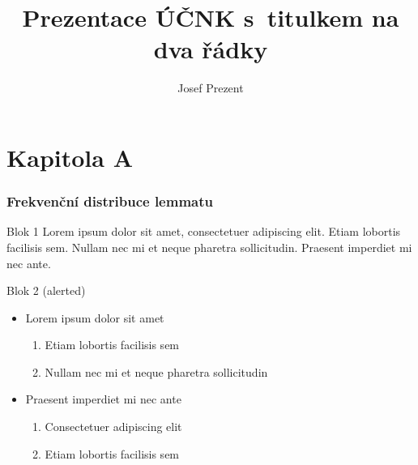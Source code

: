 \documentclass{beamer}
\title{Prezentace ÚČNK s~titulkem na dva řádky}
\author{Josef Prezent}
\begin{document}
\makeCNK

\maketitle


\section{Kapitola A}

\frame
{
  \frametitle{Frekvenční distribuce lemmatu}
  \begin{block}{Blok 1}
  Lorem ipsum dolor sit amet, \alert{consectetuer adipiscing elit}. Etiam
lobortis facilisis sem. Nullam nec mi et neque pharetra sollicitudin.
Praesent imperdiet mi nec ante.
  \end{block}
  \begin{alertblock}{Blok 2 (alerted)}
  \begin{itemize}
    \item Lorem ipsum dolor sit amet
    \begin{enumerate}
      \item Etiam lobortis facilisis sem
      \item Nullam nec mi et neque pharetra sollicitudin
    \end{enumerate}
    \item Praesent imperdiet mi nec ante
    \begin{enumerate}
      \item Consectetuer adipiscing elit
      \item Etiam lobortis facilisis sem
    \end{enumerate}
  \end{itemize}
  \end{alertblock}
}
\end{document}
